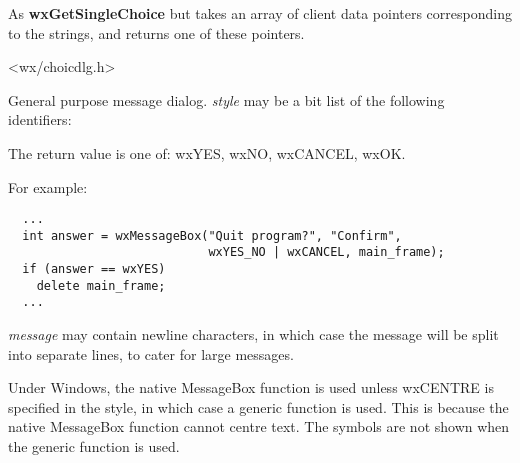As {\bf wxGetSingleChoice} but takes an array of client data pointers
corresponding to the strings, and returns one of these pointers.


<wx/choicdlg.h>

\label{wxmessagebox}


General purpose message dialog.  {\it style} may be a bit list of the
following identifiers:

\begin{twocollist}\itemsep=0pt
\end{twocollist}

The return value is one of: wxYES, wxNO, wxCANCEL, wxOK.

For example:

\begin{verbatim}
  ...
  int answer = wxMessageBox("Quit program?", "Confirm",
                            wxYES_NO | wxCANCEL, main_frame);
  if (answer == wxYES)
    delete main_frame;
  ...
\end{verbatim}

{\it message} may contain newline characters, in which case the
message will be split into separate lines, to cater for large messages.

Under Windows, the native MessageBox function is used unless wxCENTRE
is specified in the style, in which case a generic function is used.
This is because the native MessageBox function cannot centre text.
The symbols are not shown when the generic function is used.

